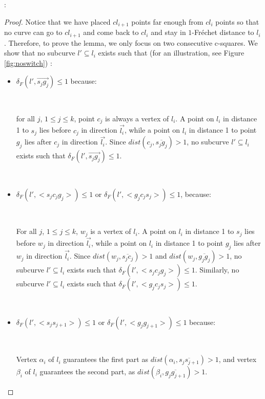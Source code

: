 \documentclass[a4paper,UKenglish]{lipics}
\newcommand{\CS}{{\mathscr S}}
\newcommand{\CQ}{{\mathscr Q}}
\newcommand{\gre}{{g}}
\newcommand{\sma}{{s}}
\newcommand{\cfev}{{l}} \newcommand{\sq}{{\CS\CQ}}
\newcommand{\Frechet}{Fr\'echet }
\newcommand{\distF}{\delta_F}
\newcommand{\Seg}[1]{{\overline{#1}}}
\newcommand{\Dir}{\overrightarrow}
\begin{document}
:
\begin{proof}
Notice that we have placed $cl_{i+1}$ points far enough from 
$cl_{i}$ points so that 
no curve can go to $cl_{i+1}$
and come back to $cl_i$ and stay 
in $1$-\Frechet distance to $\cfev_i$.
Therefore, to prove the lemma, 
we only focus on two consecutive c-squares.
We show that no subcurve $l' \subseteq \cfev_i$ exists such 
that (for an illustration, see Figure \ref{fig:noswitch}) :


\begin{itemize}

\item $\distF(l',\Dir{\sma_j\gre_j}) \le 1$ because:

\

for all $j$, $1 \le j \le k$, point $c_j$ is always a vertex of $\cfev_i$. 
A point on $\cfev_i$ in distance 1 
to $\sma_j$ lies before $c_j$ 
in direction $\Dir{\cfev_i}$, 
while a point on $\cfev_i$ in distance 1 
to point $\gre_j$ lies after $c_j$ in direction $\Dir{\cfev_i}$.
Since $dist(c_j, \Seg{\sma_j\gre_j}) >1$, 
no subcurve $l' \subseteq \cfev_i$ exists such that 
$\distF(l',\Dir{\sma_j\gre_j}) \le 1$.


\

\item $\distF(l',<\sma_jc_j\gre_{j}>) \le 1$ or $\distF(l',<\gre_jc_j\sma_{j}>) \le 1$, because:

\

For all $j$, $1 \le j \le k$, $w_j$
is a vertex of $\cfev_i$. 
A point on $\cfev_i$ in distance 1 
to $\sma_j$ lies before $w_j$ 
in direction $\Dir{\cfev_i}$, 
while a point on $\cfev_i$ in distance 1 
to point $\gre_j$ lies after $w_j$ in direction $\Dir{\cfev_i}$.
Since $dist(w_j, \Seg{\sma_jc_j}) >1$ and 
$dist(w_j, \Seg{\gre_j\gre_j}) >1$,
no subcurve $l' \subseteq \cfev_i$ exists such that 
$\distF(l', <\sma_jc_j\gre_{j}> ) \le 1$.
Similarly,  no subcurve $l' \subseteq \cfev_i$ exists such that 
$\distF(l', <\gre_jc_j\sma_j> ) \le 1$.

\

\item $\distF(l',<\sma_j\sma_{j+1}>) \le 1$ or  $\distF(l',<\gre_j\gre_{j+1}>) \le 1$ because:

\

Vertex $\alpha_{i}$ of $\cfev_{i}$
guarantees the first part as $dist( \alpha_{i},\Seg{\sma_j\sma_{j+1}}) > 1 $, 
and vertex $\beta_{i}$ of $\cfev_{i}$
guarantees the second part, 
as $dist( \beta_{i},\Seg{\gre_j\gre_{j+1}}) > 1$.


\end{itemize}
\end{proof}
\end{document}
